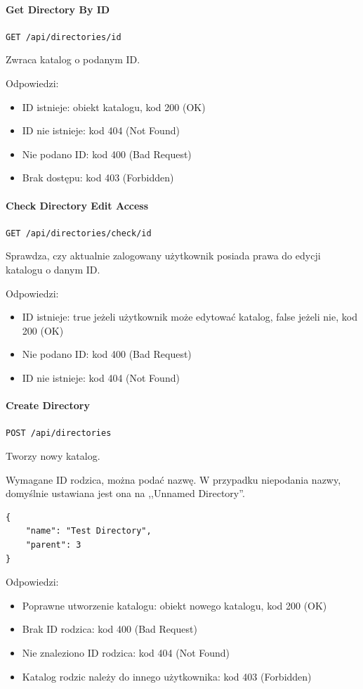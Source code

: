 \documentclass[a4paper,twoside,12pt]{book}
\begin{document}
\paragraph{Get Directory By ID}

\texttt{GET /api/directories/{id}}

Zwraca katalog o podanym ID.

Odpowiedzi: 
\begin{itemize}
	\item ID istnieje: obiekt katalogu, kod 200 (OK) 
	\item ID nie istnieje: kod 404 (Not Found) 
	\item Nie podano ID: kod 400 (Bad Request)
	\item Brak dostępu: kod 403 (Forbidden)
\end{itemize}

\paragraph{Check Directory Edit Access}

\texttt{GET /api/directories/check/{id}}

Sprawdza, czy aktualnie zalogowany użytkownik posiada prawa do edycji katalogu o danym ID.

Odpowiedzi: 
\begin{itemize}
	\item ID istnieje: true jeżeli użytkownik może edytować katalog, false jeżeli nie, kod 200 (OK) 
	\item Nie podano ID: kod 400 (Bad Request) 
	\item ID nie istnieje: kod 404 (Not Found)
\end{itemize}

\paragraph{Create Directory}

\texttt{POST /api/directories}

Tworzy nowy katalog.

Wymagane ID rodzica, można podać nazwę. W przypadku niepodania nazwy, domyślnie ustawiana jest ona na ,,Unnamed Directory''.

\begin{verbatim}
{
    "name": "Test Directory",
    "parent": 3
}
\end{verbatim}

Odpowiedzi: 
\begin{itemize}
	\item Poprawne utworzenie katalogu: obiekt nowego katalogu, kod 200 (OK) 
	\item Brak ID rodzica: kod 400 (Bad Request)
	\item Nie znaleziono ID rodzica: kod 404 (Not Found) 
	\item Katalog rodzic należy do innego użytkownika: kod 403 (Forbidden)
\end{itemize}
\end{document}
